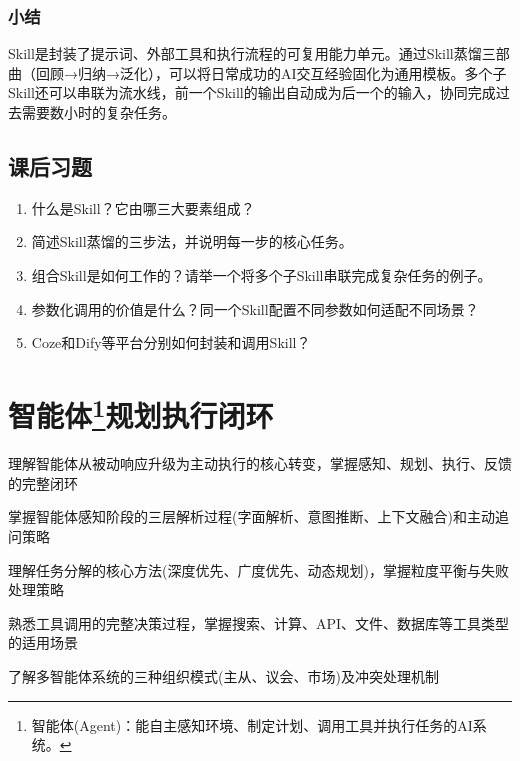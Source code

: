 \subsubsection*{小结}

Skill是封装了提示词、外部工具和执行流程的可复用能力单元。通过Skill蒸馏三部曲（回顾→归纳→泛化），可以将日常成功的AI交互经验固化为通用模板。多个子Skill还可以串联为流水线，前一个Skill的输出自动成为后一个的输入，协同完成过去需要数小时的复杂任务。

\bigskip
\subsection*{课后习题}

\begin{enumerate}
\setlength{\itemsep}{6pt}
\item 什么是Skill？它由哪三大要素组成？
\item 简述Skill蒸馏的三步法，并说明每一步的核心任务。
\item 组合Skill是如何工作的？请举一个将多个子Skill串联完成复杂任务的例子。
\item 参数化调用的价值是什么？同一个Skill配置不同参数如何适配不同场景？
\item Coze和Dify等平台分别如何封装和调用Skill？
\end{enumerate}

\newpage

\section[智能体规划执行闭环]{\textbf{智能体}\footnote{智能体(Agent)：能自主感知环境、制定计划、调用工具并执行任务的AI系统。}规划执行闭环}

\begin{sectionkeypoints}
\item 理解智能体从被动响应升级为主动执行的核心转变，掌握感知、规划、执行、反馈的完整闭环
\item 掌握智能体感知阶段的三层解析过程(字面解析、意图推断、上下文融合)和主动追问策略
\item 理解任务分解的核心方法(深度优先、广度优先、动态规划)，掌握粒度平衡与失败处理策略
\item 熟悉工具调用的完整决策过程，掌握搜索、计算、API、文件、数据库等工具类型的适用场景
\item 了解多智能体系统的三种组织模式(主从、议会、市场)及冲突处理机制
\end{sectionkeypoints}




